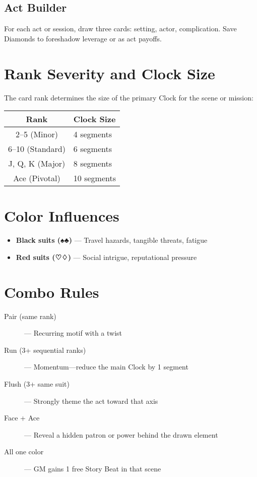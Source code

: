 \subsection*{Act Builder}
For each act or session, draw three cards: setting, actor, complication. Save Diamonds to foreshadow leverage or as act payoffs.

\section{Rank Severity and Clock Size}

The card rank determines the size of the primary Clock for the scene or mission:

\begin{center}
\begin{tabular}{cl}
\toprule
\textbf{Rank} & \textbf{Clock Size} \\
\midrule
2–5 (Minor) & 4 segments \\
6–10 (Standard) & 6 segments \\
J, Q, K (Major) & 8 segments \\
Ace (Pivotal) & 10 segments \\
\bottomrule
\end{tabular}
\end{center}

\section{Color Influences}

\begin{itemize}
  \item \textbf{Black suits (♠♣)} — Travel hazards, tangible threats, fatigue
  \item \textbf{Red suits (♡♢)} — Social intrigue, reputational pressure
\end{itemize}

\section{Combo Rules}

\begin{description}
  \item[Pair (same rank)] — Recurring motif with a twist
  \item[Run (3+ sequential ranks)] — Momentum—reduce the main Clock by 1 segment
  \item[Flush (3+ same suit)] — Strongly theme the act toward that axis
  \item[Face + Ace] — Reveal a hidden patron or power behind the drawn element
  \item[All one color] — GM gains 1 free Story Beat in that scene
\end{description}

